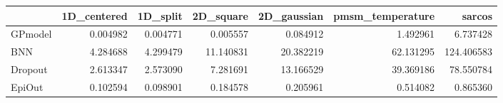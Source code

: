 \begin{tabular}{lrrrrrr}
\toprule
{} &  1D\_centered &  1D\_split &  2D\_square &  2D\_gaussian &  pmsm\_temperature &      sarcos \\
\midrule
GPmodel &     0.004982 &  0.004771 &   0.005557 &     0.084912 &          1.492961 &    6.737428 \\
BNN     &     4.284688 &  4.299479 &  11.140831 &    20.382219 &         62.131295 &  124.406583 \\
Dropout &     2.613347 &  2.573090 &   7.281691 &    13.166529 &         39.369186 &   78.550784 \\
EpiOut  &     0.102594 &  0.098901 &   0.184578 &     0.205961 &          0.514082 &    0.865360 \\
\bottomrule
\end{tabular}
